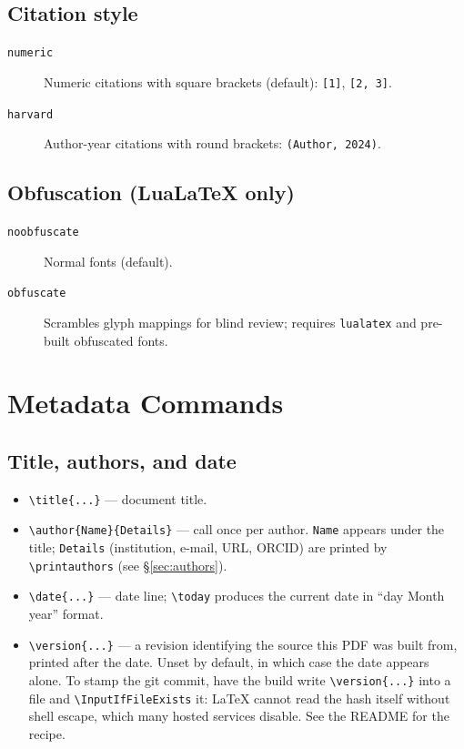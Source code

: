\documentclass[sans,oneside,numeric,raggedright]{qarticle}
\begin{document}
\subsection{Citation style}

\begin{description}
  \item[\texttt{numeric}] Numeric citations with square brackets (default):
    \texttt{[1]}, \texttt{[2, 3]}.
  \item[\texttt{harvard}] Author-year citations with round brackets:
    \texttt{(Author, 2024)}.
\end{description}

\subsection{Obfuscation (LuaLaTeX only)}

\begin{description}
  \item[\texttt{noobfuscate}] Normal fonts (default).
  \item[\texttt{obfuscate}] Scrambles glyph mappings for blind review;
    requires \texttt{lualatex} and pre-built obfuscated fonts.
\end{description}

\section{Metadata Commands}\label{sec:metadata}

\subsection{Title, authors, and date}

\begin{itemize}
    \item \verb|\title{...}| --- document title.
    \item \verb|\author{Name}{Details}| --- call once per author.  \texttt{Name}
    appears under the title; \texttt{Details} (institution, e-mail, URL,
    ORCID) are printed by \verb|\printauthors| (see \S\ref{sec:authors}).
    \item \verb|\date{...}| --- date line; \verb|\today| produces the current
    date in ``day Month year'' format.
    \item \verb|\version{...}| --- a revision identifying the source this
    PDF was built from, printed after the date.  Unset by default, in which
    case the date appears alone.  To stamp the git commit, have the build
    write \verb|\version{...}| into a file and \verb|\InputIfFileExists| it:
    \LaTeX{} cannot read the hash itself without shell escape, which many
    hosted services disable.  See the README for the recipe.
\end{itemize}
\end{document}
